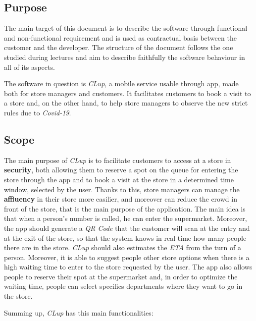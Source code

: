 \documentclass{article}
\begin{document}
	\subsection{Purpose}
	
	The main target of this document is to describe the software through functional and non-functional requirement and is used as contractual basis between the customer and the developer. The structure of the document follows the one studied during lectures and aim to describe faithfully the software behaviour in all of its aspects.
	
	The software in question is \emph{CLup}, a mobile service usable through app, made both for store managers and customers. It facilitates customers to book a visit to a store and, on the other hand, to help store managers to observe the new strict rules due to \emph{Covid-19}.
	
	\subsection{Scope}
	
	The main purpose of \emph{CLup} is to facilitate customers to access at a store in {\bfseries security}, both allowing them to reserve a spot on the queue for entering the store through the app and to book a visit at the store in a determined time window, selected by the user. Thanks to this, store managers can manage the {\bfseries affluency} in their store more easilier, and moreover can reduce the crowd in front of the store, that is the main purpose of the application. The main idea is that when a person's number is called, he can enter the supermarket. Moreover, the app should generate a \emph{QR Code} that the customer will scan at the entry and at the exit of the store, so that the system knows in real time how many people there are in the store. \emph{CLup} should also estimates the \emph{ETA} from the turn of a person. Moreover, it is able to suggest people other store options when there is a high waiting time to enter to the store requested by the user. The app also allows people to reserve their spot at the supermarket and, in order to optimize the waiting time, people can select specifics departments where they want to go in the store.
	
	Summing up, \emph{CLup} has this main functionalities:
	
	\smallskip
	
\end{document}
